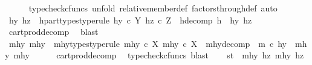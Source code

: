 \begin{isabellebody}
\ \ \ \ \isamarkupfalse%
\ {\isacharparenleft}{\kern0pt}typecheck{\isacharunderscore}{\kern0pt}cfuncs{\isacharcomma}{\kern0pt}\ unfold\ relative{\isacharunderscore}{\kern0pt}member{\isacharunderscore}{\kern0pt}def{}\ factors{\isacharunderscore}{\kern0pt}through{\isacharunderscore}{\kern0pt}def{}{\isacharcomma}{\kern0pt}\ auto{\isacharparenright}{\kern0pt}\isanewline
\ \ \isamarkupfalse%
\ \isamarkupfalse%
\ hy\ hz\ \ h{\isacharunderscore}{\kern0pt}part{\isacharunderscore}{\kern0pt}types{\isacharbrackleft}{\kern0pt}type{\isacharunderscore}{\kern0pt}rule{\isacharbrackright}{\kern0pt}{\isacharcolon}{\kern0pt}\ {\isachardoublequoteopen}hy\ {\isasymin}\isactrlsub c\ Y{\isachardoublequoteclose}\ {\isachardoublequoteopen}hz\ {\isasymin}\isactrlsub c\ Z{\isachardoublequoteclose}\ \ h{\isacharunderscore}{\kern0pt}decomp{\isacharcolon}{\kern0pt}\ {\isachardoublequoteopen}h\ {\isacharequal}{\kern0pt}\ {\isasymlangle}hy{\isacharcomma}{\kern0pt}\ hz{\isasymrangle}{\isachardoublequoteclose}\isanewline
\ \ \ \ \isamarkupfalse%
\ cart{\isacharunderscore}{\kern0pt}prod{\isacharunderscore}{\kern0pt}decomp\ \isamarkupfalse%
\ blast\isanewline
\ \ \isamarkupfalse%
\ \isamarkupfalse%
\ mhy{}\ mhy{}\ \ mhy{\isacharunderscore}{\kern0pt}types{\isacharbrackleft}{\kern0pt}type{\isacharunderscore}{\kern0pt}rule{\isacharbrackright}{\kern0pt}{\isacharcolon}{\kern0pt}\ {\isachardoublequoteopen}mhy{}\ {\isasymin}\isactrlsub c\ X{\isachardoublequoteclose}\ {\isachardoublequoteopen}mhy{}\ {\isasymin}\isactrlsub c\ X{\isachardoublequoteclose}\ \ mhy{\isacharunderscore}{\kern0pt}decomp{\isacharcolon}{\kern0pt}\ \ {\isachardoublequoteopen}m\ {\isasymcirc}\isactrlsub c\ hy\ {\isacharequal}{\kern0pt}\ {\isasymlangle}mhy{}{\isacharcomma}{\kern0pt}\ mhy{}{\isasymrangle}{\isachardoublequoteclose}\isanewline
\ \ \ \ \isamarkupfalse%
\ cart{\isacharunderscore}{\kern0pt}prod{\isacharunderscore}{\kern0pt}decomp\ \isamarkupfalse%
\ {\isacharparenleft}{\kern0pt}typecheck{\isacharunderscore}{\kern0pt}cfuncs{\isacharcomma}{\kern0pt}\ blast{\isacharparenright}{\kern0pt}\isanewline
\isanewline
\ \ \isamarkupfalse%
\ {\isachardoublequoteopen}{\isasymlangle}s{\isacharcomma}{\kern0pt}t{\isasymrangle}\ {\isacharequal}{\kern0pt}\ {\isasymlangle}{\isasymlangle}mhy{}{\isacharcomma}{\kern0pt}\ hz{\isasymrangle}{\isacharcomma}{\kern0pt}\ {\isasymlangle}mhy{}{\isacharcomma}{\kern0pt}\ hz{\isasymrangle}{\isasymrangle}{\isachardoublequoteclose}\isanewline

\end{isabellebody}
